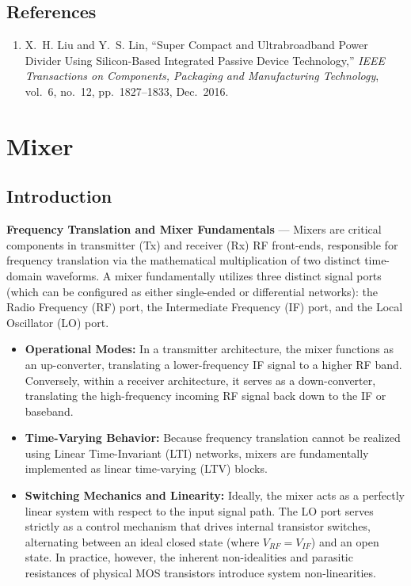 \section{References}

\begin{enumerate}
    \item[{[1]}] X.~H. Liu and Y.~S. Lin, ``Super Compact and Ultrabroadband Power Divider Using Silicon-Based Integrated Passive Device Technology,'' \emph{IEEE Transactions on Components, Packaging and Manufacturing Technology}, vol.~6, no.~12, pp.~1827--1833, Dec.~2016.
\end{enumerate}

\chapter{Mixer}

\section{Introduction}

\textbf{Frequency Translation and Mixer Fundamentals} --- Mixers are critical components in transmitter (Tx) and receiver (Rx) RF front-ends, responsible for frequency translation via the mathematical multiplication of two distinct time-domain waveforms. A mixer fundamentally utilizes three distinct signal ports (which can be configured as either single-ended or differential networks): the Radio Frequency (RF) port, the Intermediate Frequency (IF) port, and the Local Oscillator (LO) port.

\begin{itemize}
    \item \textbf{Operational Modes:} In a transmitter architecture, the mixer functions as an up-converter, translating a lower-frequency IF signal to a higher RF band. Conversely, within a receiver architecture, it serves as a down-converter, translating the high-frequency incoming RF signal back down to the IF or baseband.
    \item \textbf{Time-Varying Behavior:} Because frequency translation cannot be realized using Linear Time-Invariant (LTI) networks, mixers are fundamentally implemented as linear time-varying (LTV) blocks.
    \item \textbf{Switching Mechanics and Linearity:} Ideally, the mixer acts as a perfectly linear system with respect to the input signal path. The LO port serves strictly as a control mechanism that drives internal transistor switches, alternating between an ideal closed state (where $V_{RF} = V_{IF}$) and an open state. In practice, however, the inherent non-idealities and parasitic resistances of physical MOS transistors introduce system non-linearities.
\end{itemize}

